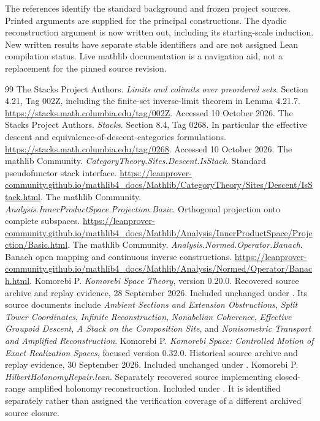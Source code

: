 \clearpage
{}\label{app:references}
The references identify the standard background and frozen project sources. Printed arguments are supplied for the principal constructions. The dyadic reconstruction argument is now written out, including its starting-scale induction. New written results have separate stable identifiers and are not assigned Lean compilation status. Live mathlib documentation is a navigation aid, not a replacement for the pinned source revision.

\begin{thebibliography}{99}
 The Stacks Project Authors. \emph{Limits and colimits over preordered sets}. Section 4.21, Tag 002Z, including the finite-set inverse-limit theorem in Lemma 4.21.7. \url{https://stacks.math.columbia.edu/tag/002Z}. Accessed 10 October 2026.
 The Stacks Project Authors. \emph{Stacks}. Section 8.4, Tag 0268. In particular the effective descent and equivalence-of-descent-categories formulations. \url{https://stacks.math.columbia.edu/tag/0268}. Accessed 10 October 2026.
 The mathlib Community. \emph{CategoryTheory.Sites.Descent.IsStack}. Standard pseudofunctor stack interface. \url{https://leanprover-community.github.io/mathlib4_docs/Mathlib/CategoryTheory/Sites/Descent/IsStack.html}.
 The mathlib Community. \emph{Analysis.InnerProductSpace.Projection.Basic}. Orthogonal projection onto complete subspaces. \url{https://leanprover-community.github.io/mathlib4_docs/Mathlib/Analysis/InnerProductSpace/Projection/Basic.html}.
 The mathlib Community. \emph{Analysis.Normed.Operator.Banach}. Banach open mapping and continuous inverse constructions. \url{https://leanprover-community.github.io/mathlib4_docs/Mathlib/Analysis/Normed/Operator/Banach.html}.
 Komorebi P. \emph{Komorebi Space Theory}, version 0.20.0. Recovered source archive and replay evidence, 28 September 2026. Included unchanged under . Its source documents include \emph{Ambient Sections and Extension Obstructions}, \emph{Split Tower Coordinates}, \emph{Infinite Reconstruction}, \emph{Nonabelian Coherence}, \emph{Effective Groupoid Descent}, \emph{A Stack on the Composition Site}, and \emph{Nonisometric Transport and Amplified Reconstruction}.
 Komorebi P. \emph{Komorebi Space: Controlled Motion of Exact Realization Spaces}, focused version 0.32.0. Historical source archive and replay evidence, 30 September 2026. Included unchanged under .
 Komorebi P. \emph{HilbertHolonomyRepair.lean}. Separately recovered source implementing closed-range amplified holonomy reconstruction. Included under . It is identified separately rather than assigned the verification coverage of a different archived source closure.
\end{thebibliography}

